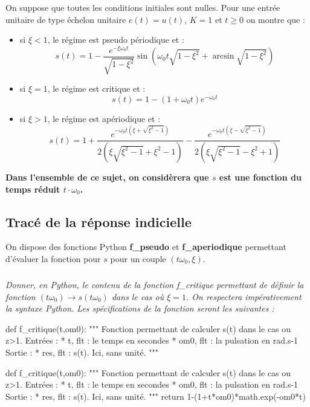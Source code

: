 \documentclass[10pt]{article}
\newif\ifprof
\begin{document}
\vspace{.5cm}

On suppose que toutes les conditions initiales sont nulles. Pour une entrée unitaire de type échelon unitaire $e(t)=u(t)$, $K=1$ et $t\geq0$ on montre que : 
\begin{itemize}
\item si $\xi <1$, le régime est pseudo périodique et :
$$
s(t)=1-\dfrac{e^{-\xi\omega_0 t}}{\sqrt{1-\xi^2}}\sin\left(  \omega_0 t\sqrt{1-\xi^2}+\arcsin \sqrt{1-\xi^2} \right)
$$
\item si $\xi=1$, le régime est critique et : 
$$
s(t)=1-\left(1+\omega_0 t \right)e^{-\omega_0 t} 
$$
\item si $\xi>1$, le régime est apériodique et : 
$$
s(t)=1
+\dfrac{e^{- \omega_0 t\left( \xi + \sqrt{\xi^2-1}\right)}}{2\left(\xi\sqrt{\xi^2-1}+\xi^2-1 \right)}
-\dfrac{e^{- \omega_0 t \left( \xi - \sqrt{\xi^2-1}\right)}}{2\left(\xi\sqrt{\xi^2-1}-\xi^2+1 \right)}
$$
\end{itemize} 

\begin{center}
\textbf{Dans l'ensemble de ce sujet, on considèrera que $s$ est une fonction du temps réduit $t\cdot\omega_0$.}
\end{center}


\subsection*{Tracé de la réponse indicielle}

On dispose des fonctions Python \textbf{\textsf{f\_pseudo}} et \textbf{\textsf{f\_aperiodique}} permettant d'évaluer la fonction pour $s$ pour un couple $(t\omega_0,\xi)$.

\subparagraph{} \textit{Donner, en Python, le contenu de la fonction \textsf{f\_critique} permettant de définir la fonction $(t\omega_0) \rightarrow s(t\omega_0)$ dans le cas où $\xi=1$. On respectera impérativement la syntaxe Python. Les spécifications de la fonction seront les suivantes : }
\begin{py}
\begin{python}
def f_critique(t,om0):
    """
    Fonction permettant de calculer s(t) dans le cas ou z>1. 
    Entrées :
        * t, flt : le temps en secondes
        * om0, flt : la pulsation en rad.s-1
    Sortie : 
        * res, flt : s(t). Ici, sans unité.
    """
\end{python}
\end{py}

\ifprof
\begin{corrige}
\begin{py}
\begin{python}
def f_critique(t,om0):
    """
    Fonction permettant de calculer s(t) dans le cas ou z>1. 
    Entrées :
        * t, flt : le temps en secondes
        * om0, flt : la pulsation en rad.s-1
    Sortie : 
        * res, flt : s(t). Ici, sans unité.
    """
    return 1-(1+t*om0)*math.exp(-om0*t) 
\end{python}
\end{py}
\end{corrige}
\else
\end{document}
